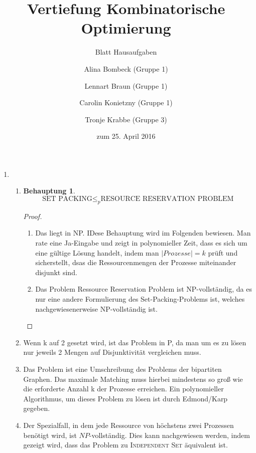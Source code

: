 \documentclass[a4paper]{scrartcl}
\title{Vertiefung Kombinatorische Optimierung}
\subtitle{Blatt {\blattnr} Hausaufgaben}
\author{%
    Alina Bombeck (Gruppe 1) \and
    Lennart Braun (Gruppe 1) \and
    Carolin Konietzny (Gruppe 1) \and
    Tronje Krabbe (Gruppe 3)
}
\date{zum 25. April 2016}
\newtheorem*{proposition}{Behauptung}
\begin{document}
\maketitle


\begin{enumerate}[label=\bfseries \arabic*.]
\item %
\begin{enumerate}
    \item %
    \begin{proposition}
        \[ \text{SET PACKING} \leq_{p} \text{RESOURCE RESERVATION PROBLEM} \]
    \end{proposition}
    \begin{proof}
        \hfill \\
        \begin{enumerate}
            \item Das  liegt in NP. IDese Behauptung wird im Folgenden bewiesen.  
            Man rate eine Ja-Eingabe und zeigt in polynomieller Zeit, dass es sich um eine gültige Lösung handelt, indem man $|Prozesse| = k$ prüft und sicherstellt, dsas die Ressourcenmengen der Prozesse miteinander disjunkt sind.
            \item Das Problem Ressource Reservation Problem ist NP-vollständig, da es nur eine andere Formulierung des Set-Packing-Problems ist, welches nachgewiesenerweise NP-vollständig ist.
        \end{enumerate}
    \end{proof}

    \item %
       Wenn k auf 2 gesetzt wird, ist das Problem in P, da man um es zu lösen nur jeweils 2 Mengen auf Disjunktivität vergleichen muss.


    \item %
     Das Problem ist eine Umschreibung des Problems der bipartiten Graphen. Das maximale Matching muss hierbei mindestens so groß wie die erforderte Anzahl k der Prozesse erreichen. Ein polynomieller Algorithmus, um dieses Problem zu lösen ist durch Edmond/Karp gegeben.

    \item %
        Der Spezialfall, in dem jede Ressource von höchstens zwei Prozessen
        benötigt wird, ist $NP$-vollständig.
        Dies kann nachgewiesen werden, indem gezeigt wird, dass das Problem zu
        \textsc{Independent Set} äquivalent ist.


\end{enumerate}
\end{enumerate}
\end{document}

